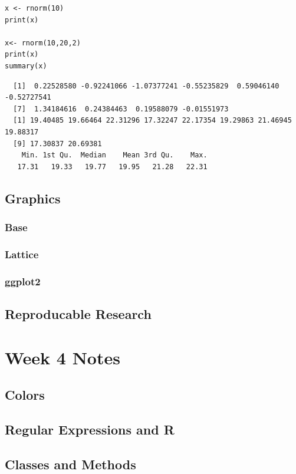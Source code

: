 \documentclass[11pt]{article}
\begin{document}
\begin{itemize}
\begin{verbatim}
x <- rnorm(10)
print(x)

x<- rnorm(10,20,2)
print(x)
summary(x)
\end{verbatim}

\begin{verbatim}
  [1]  0.22528580 -0.92241066 -1.07377241 -0.55235829  0.59046140 -0.52727541
  [7]  1.34184616  0.24384463  0.19588079 -0.01551973
  [1] 19.40485 19.66464 22.31296 17.32247 22.17354 19.29863 21.46945 19.88317
  [9] 17.30837 20.69381
    Min. 1st Qu.  Median    Mean 3rd Qu.    Max. 
   17.31   19.33   19.77   19.95   21.28   22.31
\end{verbatim}


\end{itemize} %
\subsection{Graphics}
\label{sec-3-2}
\subsubsection{Base}
\label{sec-3-2-1}
\subsubsection{Lattice}
\label{sec-3-2-2}
\subsubsection{ggplot2}
\label{sec-3-2-3}
\subsection{Reproducable Research}
\label{sec-3-3}
\section{Week 4 Notes}
\label{sec-4}
\subsection{Colors}
\label{sec-4-1}
\subsection{Regular Expressions and R}
\label{sec-4-2}
\subsection{Classes and Methods}
\label{sec-4-3}
\end{document}
